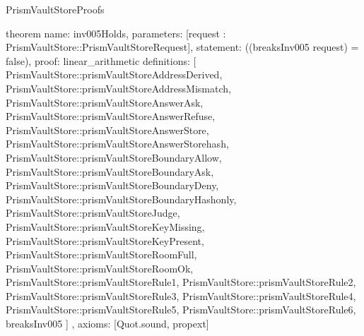 \begin{lexlean}{PrismVaultStoreProofs}
\begin{semanticmodule}
theorem{
  name: inv005Holds,
  parameters: [request : PrismVaultStore::PrismVaultStoreRequest],
  statement: ((breaksInv005 request) = false),
  proof: linear_arithmetic{
    definitions: [
      PrismVaultStore::prismVaultStoreAddressDerived,
      PrismVaultStore::prismVaultStoreAddressMismatch,
      PrismVaultStore::prismVaultStoreAnswerAsk,
      PrismVaultStore::prismVaultStoreAnswerRefuse,
      PrismVaultStore::prismVaultStoreAnswerStore,
      PrismVaultStore::prismVaultStoreAnswerStorehash,
      PrismVaultStore::prismVaultStoreBoundaryAllow,
      PrismVaultStore::prismVaultStoreBoundaryAsk,
      PrismVaultStore::prismVaultStoreBoundaryDeny,
      PrismVaultStore::prismVaultStoreBoundaryHashonly,
      PrismVaultStore::prismVaultStoreJudge,
      PrismVaultStore::prismVaultStoreKeyMissing,
      PrismVaultStore::prismVaultStoreKeyPresent,
      PrismVaultStore::prismVaultStoreRoomFull,
      PrismVaultStore::prismVaultStoreRoomOk,
      PrismVaultStore::prismVaultStoreRule1,
      PrismVaultStore::prismVaultStoreRule2,
      PrismVaultStore::prismVaultStoreRule3,
      PrismVaultStore::prismVaultStoreRule4,
      PrismVaultStore::prismVaultStoreRule5,
      PrismVaultStore::prismVaultStoreRule6,
      breaksInv005
    ]
  },
  axioms: [Quot.sound, propext]
}
\end{semanticmodule}
\end{lexlean}
